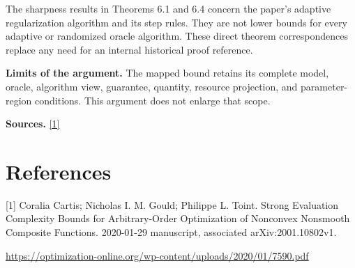 \documentclass[10pt,a4paper]{article}
\begin{document}
The sharpness results in Theorems 6.1 and 6.4 concern the paper's adaptive regularization algorithm and its step rules. They are not lower bounds for every adaptive or randomized oracle algorithm. These direct theorem correspondences replace any need for an internal historical proof reference.

\textbf{Limits of the argument.} The mapped bound retains its complete model, oracle, algorithm view, guarantee, quantity, resource projection, and parameter-region conditions. This argument does not enlarge that scope.

\textbf{Sources.} \href{https://optimization-online.org/wp-content/uploads/2020/01/7590.pdf}{[1]}

\section{References}
[1] Coralia Cartis; Nicholas I. M. Gould; Philippe L. Toint. Strong Evaluation Complexity Bounds for Arbitrary-Order Optimization of Nonconvex Nonsmooth Composite Functions. 2020-01-29 manuscript, associated arXiv:2001.10802v1.

\url{https://optimization-online.org/wp-content/uploads/2020/01/7590.pdf}
\end{document}
